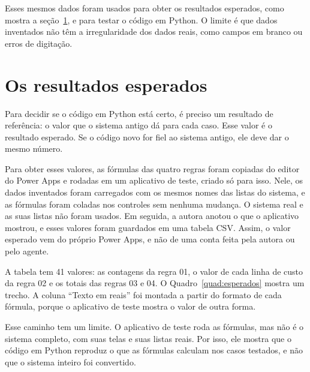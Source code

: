 Esses mesmos dados foram usados para obter os resultados esperados, como mostra a seção~\ref{sec:esperados}, e para testar o código em Python. O limite é que dados inventados não têm a irregularidade dos dados reais, como campos em branco ou erros de digitação.

\section{Os resultados esperados}
\label{sec:esperados}

Para decidir se o código em Python está certo, é preciso um resultado de referência: o valor que o sistema antigo dá para cada caso. Esse valor é o resultado esperado. Se o código novo for fiel ao sistema antigo, ele deve dar o mesmo número.

Para obter esses valores, as fórmulas das quatro regras foram copiadas do editor do Power Apps e rodadas em um aplicativo de teste, criado só para isso. Nele, os dados inventados foram carregados com os mesmos nomes das listas do sistema, e as fórmulas foram coladas nos controles sem nenhuma mudança. O sistema real e as suas listas não foram usados. Em seguida, a autora anotou o que o aplicativo mostrou, e esses valores foram guardados em uma tabela CSV. Assim, o valor esperado vem do próprio Power Apps, e não de uma conta feita pela autora ou pelo agente.

A tabela tem 41 valores: as contagens da regra 01, o valor de cada linha de custo da regra 02 e os totais das regras 03 e 04. O Quadro~\ref{quad:esperados} mostra um trecho. A coluna ``Texto em reais'' foi montada a partir do formato de cada fórmula, porque o aplicativo de teste mostra o valor de outra forma.

Esse caminho tem um limite. O aplicativo de teste roda as fórmulas, mas não é o sistema completo, com suas telas e suas listas reais. Por isso, ele mostra que o código em Python reproduz o que as fórmulas calculam nos casos testados, e não que o sistema inteiro foi convertido.

